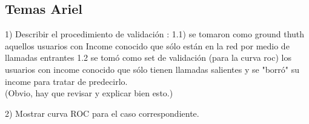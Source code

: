 \subsection {Temas Ariel}

1) Describir el procedimiento de validación :
1.1) se tomaron como ground thuth aquellos usuarios con Income conocido que sólo están en la red por medio de llamadas entrantes
1.2 se tomó como set de validación (para la curva roc)  los usuarios con income conocido que sólo tienen llamadas salientes y se "borró" su income para tratar de predecirlo. \\

(Obvio, hay que revisar y explicar bien esto.)

2) Mostrar curva ROC para el caso correspondiente.
